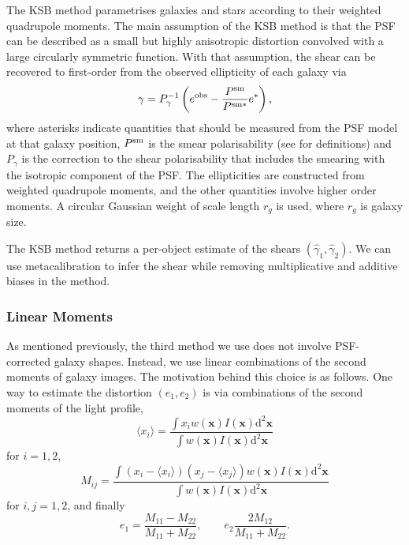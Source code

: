 \documentclass[iop]{emulateapj}
\begin{document}
The KSB method \citep{1995ApJ...449..460K} parametrises galaxies and stars according to their
weighted quadrupole moments.  The main assumption of the KSB method is that the PSF 
can be described as a small but highly anisotropic distortion
convolved with a large circularly symmetric function. 
With that assumption, the shear can be recovered to
first-order from the observed ellipticity of each galaxy via
\begin{equation} \label{eqn:weight}
\gamma=P_{\gamma}^{-1}\left(e^{\rm obs}-\frac{P^{\rm sm}}{P^{\rm sm*}}e^{*}\right),
\end{equation}
where asterisks indicate quantities that should be measured from the
PSF model at that galaxy position, $P^{\rm sm}$ is the
smear polarisability (see \citealt{2006MNRAS.368.1323H} for definitions) 
and $P_\gamma$ is the correction to the shear
polarisability that includes the smearing with the isotropic component
of the PSF. The ellipticities are constructed from 
weighted quadrupole moments, and the other quantities involve
higher order moments. A  circular Gaussian weight 
of scale length $r_g$ is used, where $r_g$ is galaxy
size.

The KSB method returns a per-object estimate of the shears $(\hat{\gamma}_1, \hat{\gamma}_2)$. We can use
metacalibration to infer the shear while removing multiplicative and additive biases in the method.

\subsubsection{Linear Moments}

As mentioned previously, the third method we use does not involve PSF-corrected galaxy shapes.
Instead, we use linear combinations of the second moments of galaxy images.  The motivation behind
this choice is as follows.  One way to estimate the distortion $(e_1,e_2)$ is via combinations of
the second moments of the light profile,
\begin{equation}
\langle x_i\rangle = \frac{\int x_i w({\mathbf x}) I({\mathbf x}) \mathrm{d}^2{\mathbf x}}{\int w({\mathbf x}) I({\mathbf x}) \mathrm{d}^2{\mathbf x}}
\end{equation}
for $i=1, 2$,
\begin{equation}
M_{ij} = \frac{\int (x_i-\langle x_i\rangle)(x_j-\langle x_j\rangle) w({\mathbf x}) I({\mathbf x}) \mathrm{d}^2{\mathbf x}}{\int w({\mathbf x}) I({\mathbf x}) \mathrm{d}^2{\mathbf x}}
\end{equation}
for $i,j=1,2$, and finally 
\begin{equation}\label{eq:moments-div}
e_1 = \frac{M_{11}-M_{22}}{M_{11}+M_{22}}, \qquad e_2 \frac{2M_{12}}{M_{11}+M_{22}}.
\end{equation}
\end{document}
